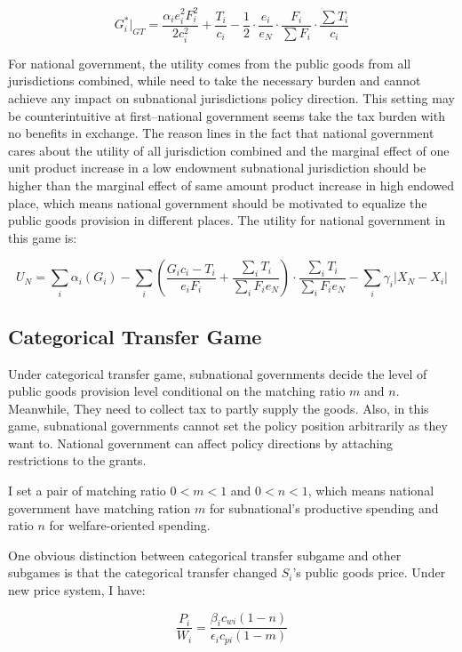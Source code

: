 \begin{itemize}
\begin{equation}
    G_i^*|_{GT}=\frac{\alpha_i e_i^2F_i^2}{2c_i^2}+\frac{T_i}{c_i}-\frac{1}{2}\cdot \frac{e_i}{e_N}\cdot \frac{F_i}{\sum F_i} \cdot \frac{\sum T_i}{c_i}
\end{equation} \label{gofgeneral}


For national government, the utility comes from the public goods from all jurisdictions combined, while need to take the necessary burden and cannot achieve any impact on subnational jurisdictions policy direction. This setting may be counterintuitive at first--national government seems take the tax burden with no benefits in exchange. The reason lines in the fact that national government cares about the utility of all jurisdiction combined and the marginal effect of one unit product increase in a low endowment subnational jurisdiction should be higher than the marginal effect of same amount product increase in high endowed place, which means national government should be motivated to equalize the public goods provision in different places. The utility for national government in this game is:

\begin{equation}
    U_N=\sum_i \alpha_i(G_i)-\sum_i(\frac{G_ic_i-T_i}{e_iF_i}+\frac{\sum_iT_i}{\sum_iF_ie_N})\cdot \frac{\sum_iT_i}{\sum_iF_ie_N}-\sum_i \gamma_i|X_N-X_i|
\end{equation}

\subsection{Categorical Transfer Game}
Under categorical transfer game, subnational governments decide the level of public goods provision level conditional on the matching ratio $m$ and $n$. Meanwhile, They need to collect tax to partly supply the goods. Also, in this game, subnational governments cannot set the policy position arbitrarily as they want to. National government can affect policy directions by attaching restrictions to the grants.

I set a pair of matching ratio $0 < m <1$ and $0<n<1$, which means national government have matching ration $m$ for subnational's productive spending and ratio $n$ for welfare-oriented spending.

One obvious distinction between categorical transfer subgame and other subgames is that the categorical transfer changed $S_i$'s public goods price.
Under new price system, I have:

$$\frac{P_i}{W_i}=\frac{\beta_ic_{wi}(1-n)}{\epsilon_ic_{pi}(1-m)}$$


\end{itemize}
